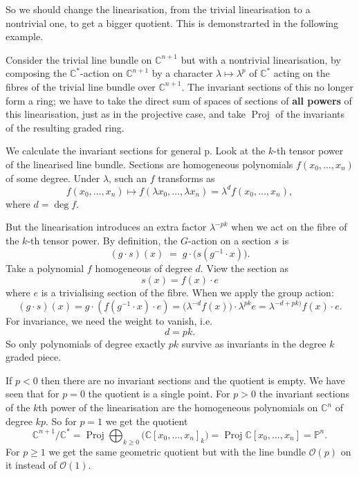 \documentclass[12pt]{article}
\begin{document}
So we should change the linearisation, from the trivial linearisation to a nontrivial one, to get a bigger quotient. This is demonstrarted in the following example.

\begin{example}
    Consider the trivial line bundle on $\mathbb{C}^{n+1}$ but with a nontrivial 
linearisation, by composing the $\mathbb{C}^*$-action on $\mathbb{C}^{n+1}$ by a character 
$\lambda \mapsto \lambda^{p}$ of $\mathbb{C}^*$ acting on the fibres of the trivial line 
bundle over $\mathbb{C}^{n+1}$. The invariant sections of this no longer form a ring; we 
have to take the direct sum of spaces of sections of \textbf{all powers} of this linearisation, 
just as in the projective case, and take $\operatorname{Proj}$ of the invariants of the 
resulting graded ring.

We calculate the invariant sections for general p. Look at the $k$-th tensor power of the linearised line bundle. Sections are homogeneous polynomials $f(x_0,\dots,x_n)$ of some degree. Under $\lambda$, such an $f$ transforms as
\[
f(x_0,\dots,x_n) \mapsto f(\lambda x_0,\dots,\lambda x_n) = \lambda^d f(x_0,\dots,x_n),
\]
where $d=\deg f$.

But the linearisation introduces an extra factor $\lambda^{-pk}$ when we act on the fibre of the $k$-th tensor power. By definition, the $G$-action on a section $s$ is
\[
(g\cdot s)(x) \;=\; g\cdot \big(s(g^{-1}\cdot x)\big).
\]
Take a polynomial $f$ homogeneous of degree $d$. View the section as
\[s(x) = f(x)\cdot e\]
where $e$ is a trivialising section of the fibre. When we apply the group action:
\[
(g\cdot s)(x) = g\cdot(f(g^{-1}\cdot x)\cdot e)
= \big(\lambda^{-d} f(x)\big)\cdot \lambda^{pk} e
= \lambda^{-d+pk)} f(x)\cdot e.
\]
For invariance, we need the weight to vanish, i.e.
\[
d = pk.
\]
So only polynomials of degree exactly $pk$ survive as invariants in the degree $k$ graded piece.

If $p<0$ then there are no invariant sections and the quotient is empty. We have seen that 
for $p=0$ the quotient is a single point. For $p>0$ the invariant sections of the $k$th 
power of the linearisation are the homogeneous polynomials on $\mathbb{C}^n$ of degree $kp$. 
So for $p=1$ we get the quotient
\begin{equation}
\mathbb{C}^{n+1}/\mathbb{C}^* 
= \operatorname{Proj} \bigoplus_{k\ge 0} \big(\mathbb{C}[x_0,\dots,x_n]_k\big) 
= \operatorname{Proj} \mathbb{C}[x_0,\dots,x_n] = \mathbb{P}^n.
\end{equation}
For $p\ge 1$ we get the same geometric quotient but with the line bundle 
$\mathcal{O}(p)$ on it instead of $\mathcal{O}(1)$.


\end{example}
\end{document}
